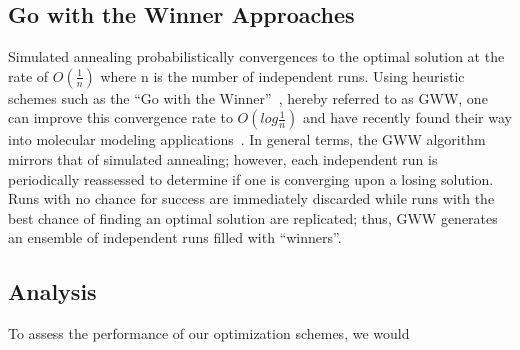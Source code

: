 \documentclass[12pt,onecolumn,notitlepage]{article}
\begin{document}
\subsection{Go with the Winner Approaches}
Simulated annealing probabilistically convergences to the optimal solution at the rate
 of $O(\frac{1}{n})$ where n is the number of independent runs.  
Using heuristic schemes such as the ``Go with the Winner''~\cite{Aldous1994gwt}, hereby referred to as GWW, 
one can improve this convergence rate to $O(log \frac{1}{n})$ and have recently found their way into molecular modeling applications~\cite{Peinado1997gwt}.  In general terms, the GWW algorithm mirrors that of simulated annealing; however, each independent run is periodically reassessed to determine if one is converging upon a losing solution.  Runs with 
no chance for success are immediately discarded while runs with the best chance of finding an optimal solution
are replicated; thus, GWW generates an ensemble of independent runs filled with  ``winners''.  

\subsection{Analysis}
To assess the performance of our optimization schemes, we would




\end{document}
